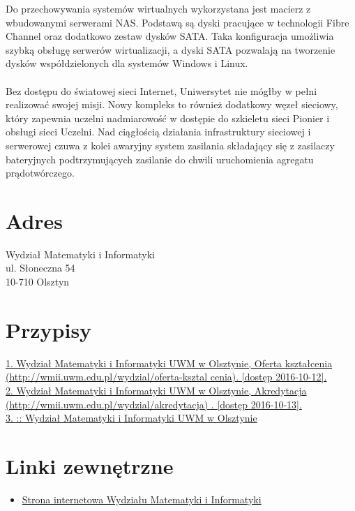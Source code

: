 \documentclass[a4paper,12pt]{article}
\begin{document}
Do przechowywania systemów wirtualnych wykorzystana jest macierz z wbudowanymi serwerami NAS.
Podstawą są dyski pracujące w technologii Fibre Channel oraz dodatkowo zestaw dysków SATA. Taka
konfiguracja umożliwia szybką obsługę serwerów wirtualizacji, a dyski SATA pozwalają na tworzenie dysków
współdzielonych dla systemów Windows i Linux.\\\\
Bez dostępu do światowej sieci Internet, Uniwersytet nie mógłby w pełni realizować swojej misji. Nowy
kompleks to również dodatkowy węzeł sieciowy, który zapewnia uczelni nadmiarowość w dostępie do
szkieletu sieci Pionier i obsługi sieci Uczelni. Nad ciągłością działania infrastruktury sieciowej i serwerowej
czuwa z kolei awaryjny system zasilania składający się z zasilaczy bateryjnych podtrzymujących zasilanie do
chwili uruchomienia agregatu prądotwórczego.

\section{Adres}
Wydział Matematyki i Informatyki\\
ul. Słoneczna 54\\
10-710 Olsztyn\\

\section{Przypisy}

\href{http://wmii.uwm.edu.pl/wydzial/oferta-ksztalcenia}{1. Wydział Matematyki i Informatyki UWM w Olsztynie, Oferta kształcenia (http://wmii.uwm.edu.pl/wydzial/oferta-ksztal
cenia). [dostęp 2016-10-12].}\\
\href{http://wmii.uwm.edu.pl/wydzial/akredytacja}{2. Wydział Matematyki i Informatyki UWM w Olsztynie, Akredytacja (http://wmii.uwm.edu.pl/wydzial/akredytacja) .
[dostęp 2016-10-13].}\\
\href{http://wmii.uwm.edu.pl/index.php?content=uprawnienia}{3. :: Wydział Matematyki i Informatyki UWM w Olsztynie}

\section{Linki zewnętrzne}
\begin{itemize}
\item \href{http://wmii.uwm.edu.pl/}{Strona internetowa Wydziału Matematyki i Informatyki}
\end{itemize}
\end{document}
